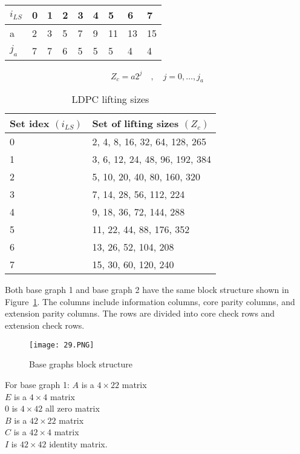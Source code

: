 \begin{tabularx}{0.8\textwidth} { | m{1em} | m{1cm}| m{1cm} | m{1em} | m{1cm}| m{1cm} | m{1em} | m{1cm}| m{1cm} | } 
    \hline
    $i_{LS}$ & 0 & 1 & 2 & 3 & 4 & 5 & 6 & 7 \\
    \hline
    a & 2 & 3 & 5 & 7 & 9 & 11 & 13 & 15 \\
    \hline
    $j_a$ & 7 & 7 & 6 & 5 & 5 & 5 & 4 & 4 \\
    \hline
\end{tabularx}
\[Z_c = a2^j \quad , \quad j = 0, \ldots ,j_a\]
\begin{table}[!ht]
    \centering
    \caption{LDPC lifting sizes}
    \begin{tabular}{ll}
        \toprule
        Set idex $(i_{LS})$ & Set of lifting sizes $(Z_c)$ \\
        \midrule
        0 & 2, 4, 8, 16, 32, 64, 128, 265 \\
        1 & 3, 6, 12, 24, 48, 96, 192, 384 \\
        2 & 5, 10, 20, 40, 80, 160, 320 \\
        3 & 7, 14, 28, 56, 112, 224 \\
        4 & 9, 18, 36, 72, 144, 288 \\
        5 & 11, 22, 44, 88, 176, 352 \\
        6 & 13, 26, 52, 104, 208 \\
        7 & 15, 30, 60, 120, 240 \\
        \bottomrule
    \end{tabular}
    \label{tbl:ldpc lifting sizes}
\end{table}

Both base graph 1 and base graph 2 have the same block structure shown in Figure~\ref{fig:block structure}. The columns include information columns, core parity columns, and extension parity columns. The rows are divided into core check rows and extension check rows.

\begin{figure}[h]
\centering
\texttt{[image: 29.PNG]}
\caption{Base graphs block structure}
\label{fig:block structure}
\end{figure}

For base graph 1:
$A$ is a $4 \times 22$ matrix \\
$E$ is a $4 \times 4$ matrix \\
$0$ is $4 \times 42$ all zero matrix \\
$B$ is a $42 \times 22$ matrix \\
$C$ is a $42 \times 4$ matrix \\
$I$ is $42 \times 42$ identity matrix. \\

